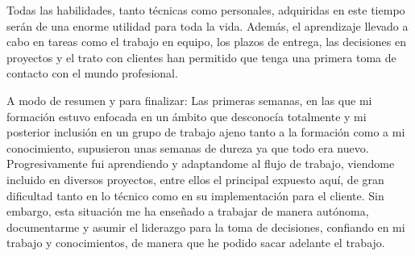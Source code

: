 Todas las habilidades, tanto técnicas como personales, adquiridas en este tiempo serán de una enorme utilidad para toda la vida. Además, el aprendizaje llevado a cabo en tareas como el trabajo en equipo, los plazos de entrega, las decisiones en proyectos y el trato con clientes han permitido que tenga una primera toma de contacto con el mundo profesional.

A modo de resumen y para finalizar: Las primeras semanas, en las que mi formación estuvo enfocada en un ámbito que desconocía totalmente y mi posterior inclusión en un grupo de trabajo ajeno tanto a la formación como a mi conocimiento, supusieron unas semanas de dureza ya que todo era nuevo. Progresivamente fui aprendiendo y adaptandome al flujo de trabajo, viendome incluido en diversos proyectos, entre ellos el principal expuesto aquí, de gran dificultad tanto en lo técnico como en su implementación para el cliente. Sin embargo, esta situación me ha enseñado a trabajar de manera autónoma, documentarme y asumir el liderazgo para la toma de decisiones, confiando en mi trabajo y conocimientos, de manera que he podido sacar adelante el trabajo.
%
%
%